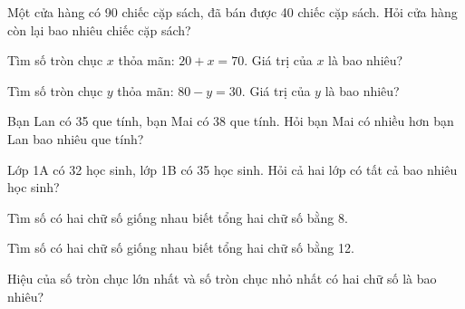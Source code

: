 \begin{ex}
Một cửa hàng có 90 chiếc cặp sách, đã bán được 40 chiếc cặp sách. Hỏi cửa hàng còn lại bao nhiêu chiếc cặp sách?
\end{ex}

\begin{ex}
Tìm số tròn chục $x$ thỏa mãn: $20 + x = 70$. Giá trị của $x$ là bao nhiêu?
\end{ex}

\begin{ex}
Tìm số tròn chục $y$ thỏa mãn: $80 - y = 30$. Giá trị của $y$ là bao nhiêu?
\end{ex}

\begin{ex}
Bạn Lan có 35 que tính, bạn Mai có 38 que tính. Hỏi bạn Mai có nhiều hơn bạn Lan bao nhiêu que tính?
\end{ex}

\begin{ex}
Lớp 1A có 32 học sinh, lớp 1B có 35 học sinh. Hỏi cả hai lớp có tất cả bao nhiêu học sinh?
\end{ex}

\begin{ex}
Tìm số có hai chữ số giống nhau biết tổng hai chữ số bằng 8.
\end{ex}

\begin{ex}
Tìm số có hai chữ số giống nhau biết tổng hai chữ số bằng 12.
\end{ex}

\begin{ex}
Hiệu của số tròn chục lớn nhất và số tròn chục nhỏ nhất có hai chữ số là bao nhiêu?
\end{ex}

